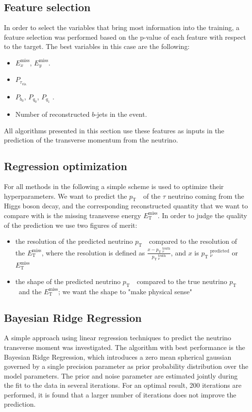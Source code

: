 \documentclass[twocolumn]{scrartcl}
\newcommand{\etmiss}{$E_\mathrm{T}^\text{miss}$}
\newcommand{\exmiss}{$E_x^\text{miss}$}
\newcommand{\eymiss}{$E_y^\text{miss}$}
\newcommand{\pt}{\ensuremath{p_\text{T}}~}
\begin{document}
\subsection{Feature selection}
In order to select the variables that bring most information into the training, a feature selection was performed based on the p-value of each feature with respect to the target. The best variables in this case are the following:

\begin{itemize}
    \item \exmiss, \eymiss.
    \item $P_{\tau_\mathrm{vis.}}$ 
     \item $P_{b_0}$, $P_{q_0}$, $P_{q_1}$ .
     \item Number of reconstructed $b$-jets in the event.
\end{itemize}

All algorithms presented in this section use these features as inputs in the prediction of the transverse momentum from the neutrino.

\subsection{Regression optimization}
\label{sec:optimization}
For all methods in the following a simple scheme is used to optimize their hyperparameters. We want to predict the \pt\ of the $τ$ neutrino coming from the Higgs boson decay, and the corresponding reconstructed quantity that we want to compare with is the missing transverse energy \etmiss. In order to judge the quality of the prediction we use two figures of merit:
\begin{itemize}
  \item the resolution of the predicted neutrino \pt\ compared to the resolution of the \etmiss, where the resolution is defined as $\frac{x-\pt_ν^{\text{truth}}}{\pt_ν^{\text{truth}}}$, and $x$ is $\pt_ν^{\text{predicted}}$ or \etmiss
  \item the shape of the predicted neutrino \pt\ compared to the true neutrino \pt and the \etmiss; we want the shape to "make physical sense"
\end{itemize}

\subsection{Bayesian Ridge Regression}

A simple approach using linear regression techniques to predict the neutrino transverse moment was investigated. The algorithm with best performance is the Bayesian Ridge Regression, which introduces a zero mean spherical gaussian governed by a single precision parameter as prior probability distribution over the model parameters. The prior and noise parameter are estimated jointly during the fit to the data in several iterations. For an optimal result, 200 iterations are performed, it is found that a larger number of iterations does not improve the prediction.
\end{document}
